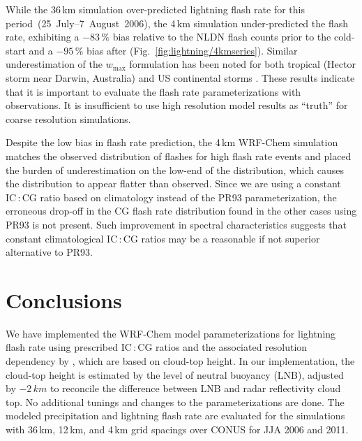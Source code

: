 While the 36\,\unit{km} simulation over-predicted lightning flash rate for
this period~(25~July--7~August~2006), the 4\,\unit{km} simulation
under-predicted the flash rate, exhibiting a $-83\,{\%}$ bias relative to the
NLDN flash counts prior to the cold-start and a $-95\,{\%}$ bias after
(Fig.~\ref{fig:lightning/4kmseries}). Similar underestimation of the $w_{\max}$
formulation has been noted for both tropical (Hector storm near Darwin,
Australia) and US continental storms \citep{Cummings:2013vn}. These results
indicate that it is important to evaluate the flash rate parameterizations
with observations. It is insufficient to use high resolution model results as
``truth'' for coarse resolution simulations.

Despite the low bias in flash rate prediction, the 4\,\unit{km} WRF-Chem
simulation matches the observed distribution of flashes for high flash rate
events and placed the burden of underestimation on the low-end of the
distribution, which causes the distribution to appear flatter than observed.
Since we are using a constant IC\,:\,CG ratio based on
\citet{Boccippio:2001ys} climatology instead of the PR93 parameterization,
the erroneous drop-off in the CG flash rate distribution found in the other
cases using PR93 is not present. Such improvement in spectral characteristics
suggests that constant climatological IC\,:\,CG ratios may be a reasonable if
not superior alternative to PR93.

\section{Conclusions}\label{sec:lightning/conclusions}

We have implemented the WRF-Chem model parameterizations for lightning
flash rate using prescribed IC\,:\,CG ratios and the associated resolution dependency by
\citet{Price:1992wb,Price:1993fk,Price:1994fk}, which are based on cloud-top
height. In our implementation, the cloud-top height is estimated by the level
of neutral buoyancy (LNB), adjusted by $-2\,\unit{km}$ to reconcile the
difference between LNB and radar reflectivity cloud top. No additional
tunings and changes to the parameterizations are done. The modeled
precipitation and \mbox{lightning} flash rate are evaluated for the simulations with
36\,\unit{km}, 12\,\unit{km}, and 4\,\unit{km} grid spacings over CONUS for
JJA 2006 and 2011.

